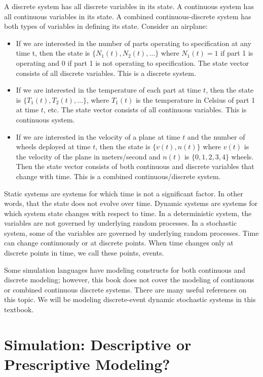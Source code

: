 \documentclass[
]{book}
\theoremstyle{definition}
\theoremstyle{definition}
\theoremstyle{definition}
\theoremstyle{definition}
\theoremstyle{remark}
\begin{document}
A discrete system has all discrete variables in its state. A continuous
system has all continuous variables in its state. A combined
continuous-discrete system has both types of variables in defining its
state. Consider an airplane:

\begin{itemize}
\item
  If we are interested in the number of parts operating to
  specification at any time t, then the state is \(\{N_1(t), N_2(t), \dots \}\)
  where \(N_1(t) = 1\) if part 1 is operating and 0 if part 1 is not
  operating to specification. The state vector consists of all
  discrete variables. This is a discrete system.
\item
  If we are interested in the temperature of each part at time \(t\), then
  the state is \(\{T_1(t), T_2(t), \dots \}\), where \(T_1(t)\) is the temperature
  in Celsius of part 1 at time \(t\), etc. The state vector consists of
  all continuous variables. This is continuous system.
\item
  If we are interested in the velocity of a plane at time \(t\) and the
  number of wheels deployed at time \(t\), then the state is \(\{v(t), n(t)\}\)
  where \(v(t)\) is the velocity of the plane in meters/second and \(n(t)\) is
  \(\{0,1,2,3,4\}\) wheels. Then the state vector consists of both
  continuous and discrete variables that change with time. This is a
  combined continuous/discrete system.
\end{itemize}

Static systems are systems for which time is not a significant factor. In other words, that the
state does not evolve over time. Dynamic systems are systems for which
system state changes with respect to time. In a deterministic system, the variables
are not governed by underlying random processes. In a stochastic
system, some of the variables are governed by underlying random
processes. Time can change continuously or at discrete points. When time
changes only at discrete points in time, we call these points, events.

Some simulation languages have modeling constructs for both
continuous and discrete modeling; however, this book does not cover the
modeling of continuous or combined continuous discrete systems. There are
many useful references on this topic. We will be modeling discrete-event dynamic stochastic systems in this textbook.

\hypertarget{simulation-descriptive-or-prescriptive-modeling}{%
\section{Simulation: Descriptive or Prescriptive Modeling?}\label{simulation-descriptive-or-prescriptive-modeling}}
\end{document}
